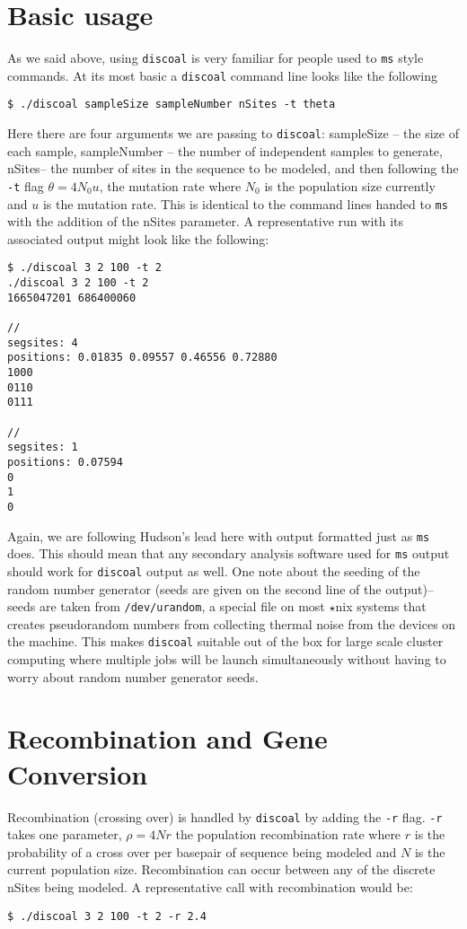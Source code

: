 \documentclass[12pt]{article}
\begin{document}
\section*{Basic usage}
As we said above, using \texttt{discoal} is very familiar for people used to \texttt{ms} style commands. At its
most basic a \texttt{discoal} command line looks like the following
\begin{verbatim}
$ ./discoal sampleSize sampleNumber nSites -t theta
\end{verbatim}
Here there are four arguments we are passing to \texttt{discoal}: sampleSize -- the size of each sample, sampleNumber -- the
number of independent samples to generate, nSites-- the number of sites in the sequence to be modeled, and then following the \texttt{-t}
flag $\theta = 4N_0u$, the mutation rate where $N_0$ is the population size currently and $u$ is the mutation rate. This is identical to 
the command lines handed to \texttt{ms} with the addition of the nSites parameter. A representative run with its associated output might look like the following:
\begin{verbatim}
$ ./discoal 3 2 100 -t 2
./discoal 3 2 100 -t 2
1665047201 686400060

//
segsites: 4
positions: 0.01835 0.09557 0.46556 0.72880
1000
0110
0111

//
segsites: 1
positions: 0.07594
0
1
0
\end{verbatim}
Again, we are following Hudson's lead here with output formatted just as \texttt{ms} does. This should mean that any secondary analysis software
used for \texttt{ms} output should work for \texttt{discoal} output as well. One note about the seeding of the random number generator (seeds are given
on the second line of the output)-- seeds are taken from \texttt{/dev/urandom}, a special file on most $\star$nix systems that creates pseudorandom numbers
from collecting thermal noise from the devices on the machine. This makes \texttt{discoal} suitable out of the box for large scale cluster computing 
where multiple jobs will be launch simultaneously without having to worry about random number generator seeds.

\section*{Recombination and Gene Conversion}
Recombination (crossing over) is handled by \texttt{discoal} by adding the \texttt{-r} flag. \texttt{-r} takes one parameter, $\rho=4Nr$ the population recombination rate where $r$ is the probability of a cross over per basepair of sequence being modeled and $N$ is the current population size. Recombination can occur between any of the discrete nSites being modeled. A representative call with recombination would be:
\begin{verbatim}
$ ./discoal 3 2 100 -t 2 -r 2.4
\end{verbatim}
\end{document}
